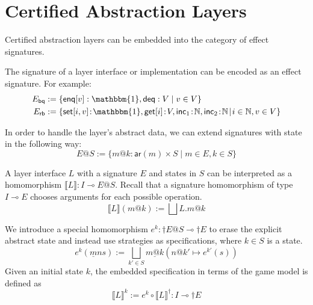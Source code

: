 \documentclass[sigplan,10pt,review,anonymous]{acmart}
\newcommand{\kw}[1]{\ensuremath{\mathsf{#1}}}
\begin{document}
\section{Certified Abstraction Layers}

Certified abstraction layers can be embedded into the category of effect
signatures.

The signature of a layer interface or implementation
can be encoded as an effect signature.
For example:
\begin{align*}
  E_\kw{bq} &:= \{
    \kw{enq}[v] : \mathbbm{1}, \kw{deq} : V \mid
    v \in V \} \\
  E_\kw{rb} &:= \{
    \kw{set}[i, v] \! : \! \mathbbm{1},
    \kw{get}[i] \! : \! V,
    \kw{inc}_1 \! : \! \mathbb{N},
    \kw{inc}_2 \! : \! \mathbb{N} \! \mid \!
    i \in \mathbb{N}, v \in V \}
\end{align*}

In order to handle the layer's abstract data,
we can extend signatures with state in the following way:
\[
  E@S :=
    \{ m@k : \kw{ar}(m) \times S \mid
       m \in E, k \in S \}
\]

A layer interface $L$ with a signature $E$
and states in $S$
can be interpreted as
a homomorphism $\llbracket L \rrbracket : I \multimap E@S$.
Recall that a signature homomorphism of type $I \multimap E$
chooses arguments for each possible operation.
\[
  \llbracket L \rrbracket (m@k) :=
    \bigsqcup L.m@k
\]

We introduce a special homomorphism $e^k : \dagger E@S \multimap \dagger E$
to erase the explicit abstract state and instead use
strategies as specifications, where $k \in S$
is a state.
\[
  e^k(\underline{m}ns) \mathrel{:=} \bigsqcup_{k'\in S} \underline{m@k}(n@k' \mapsto e^{k'}(s))
\]
Given an initial state $k$, the embedded specification
in terms of the game model is defined as
\[
  \llbracket L \rrbracket^k \mathrel{:=} e^k \circ \llbracket L \rrbracket^\dagger : I \multimap \dagger E
\]
\end{document}
